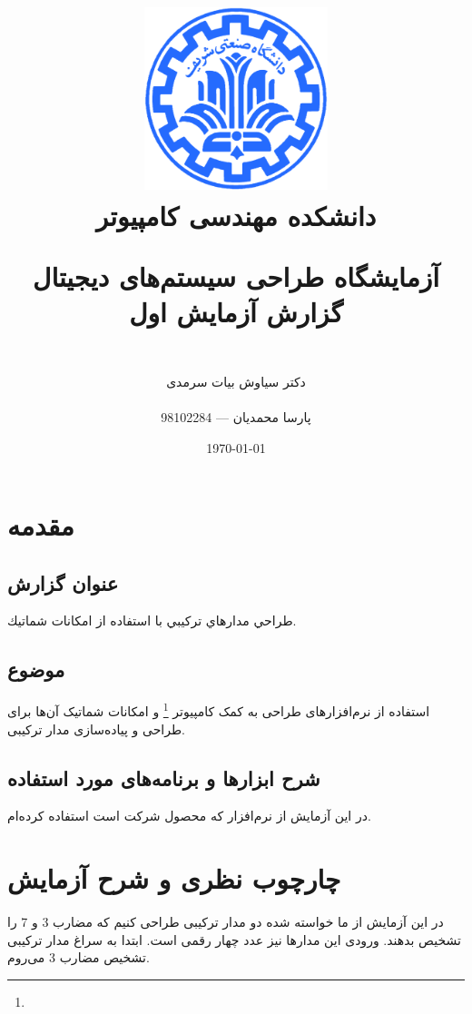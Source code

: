 \documentclass[fleqn]{article}
\title{
\includegraphics[width=0.4\textwidth]{sharif.png}\\
\normalsize{دانشکده مهندسی کامپیوتر}\\
\vspace{1cm}
	
\huge{آزمایشگاه طراحی سیستم‌های دیجیتال}
\\
\Large{گزارش آزمایش اول}
\\
}
\author{
\\
دکتر سیاوش بیات سرمدی
\\
\\
پارسا محمدیان --- 98102284
}
\date{\today}
\begin{document}
\clearpage\maketitle
\thispagestyle{empty}

\newpage

\pagestyle{fancy}



\tableofcontents

\setcounter{page}{1}

\newpage

\section{مقدمه}

\subsection*{عنوان گزارش}
طراحي مدارهاي تركيبي با استفاده از امكانات شماتيك.
\subsection*{موضوع}
استفاده از نرم‌افزارهای طراحی به کمک کامپیوتر \footnote{} و امکانات 
شماتیک آن‌ها برای طراحی و پیاده‌سازی مدار ترکیبی.
\subsection*{شرح ابزارها و برنامه‌های مورد استفاده}
در این آزمایش از نرم‌افزار  که محصول شرکت  است 
استفاده کرده‌ام.

\section{چارچوب نظری و شرح آزمایش}
در این آزمایش از ما خواسته شده دو مدار ترکیبی طراحی کنیم که مضارب 3 و 7 را 
تشخیص بدهند. ورودی این مدارها نیز عدد  چهار رقمی است. ابتدا به سراغ 
مدار ترکیبی تشخیص مضارب 3 می‌روم.
\end{document}
